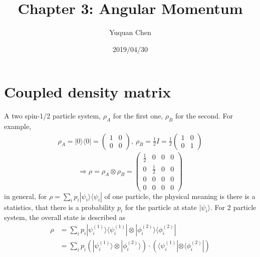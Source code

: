 \documentclass[UTF8,12pt]{article} %
\begin{document}
\title{Chapter 3: Angular Momentum}
\author{Yuquan Chen}
\date{2019/04/30} %
\maketitle

\section{Coupled density matrix}

A two spin-1/2 particle system, $\rho_{A}$ for the first one, $\rho_{B}$ for the second. For example, 
\begin{align*}
\rho_{A} = |0\rangle\langle 0| = \begin{pmatrix}1&0\\0&0\end{pmatrix},~ \rho_{B} = \frac{1}{2} I = \frac{1}{2}\begin{pmatrix}1&0\\0&1\end{pmatrix}
\end{align*}
$$\Rightarrow \rho = \rho_{A} \otimes \rho_{B} = \begin{pmatrix}\frac{1}{2}&0&0&0\\0&\frac{1}{2}&0&0\\0&0&0&0\\0&0&0&0\end{pmatrix}$$
in general, for $\rho = \sum_{i}p_{i}|\psi_{i}\rangle\langle \psi_{i}|$ of one particle, the physical meaning is there is a statistics, that there is a probability $p_{i}$ for the particle at state $|\psi_{i}\rangle$. For 2 particle system, the overall state is described as
\begin{align}
\rho &= \sum_{i}p_{i}|\psi_{i}^{(1)}\rangle\langle\psi_{i}^{(1)}| \otimes |\phi_{i}^{(2)}\rangle\langle\phi_{i}^{(2)}| \\
&= \sum_{i} p_{i}\left(|\psi_{i}^{(1)}\rangle \otimes |\phi_{i}^{(2)}\rangle\right) \cdot \left(\langle\psi_{i}^{(1)}|\otimes\langle\phi_{i}^{(2)}|\right)
\end{align}
\end{document}
